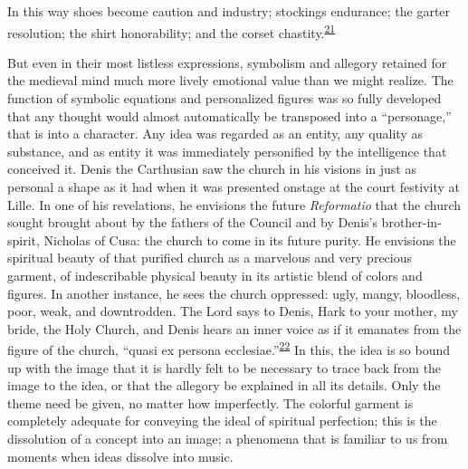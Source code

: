 In this way shoes become caution and industry; stockings endurance; the
garter resolution; the shirt honorability; and the corset
chastity.\textsuperscript{\protect\hypertarget{16_Chapter_Nine__THE_DECLINE_OF_SYM.xhtmlux5cux23id_752}{\protect\hyperlink{23_NOTES.xhtmlux5cux23id_753}{21}}}

But even in their most listless expressions, symbolism and allegory
retained for the medieval mind much more lively emotional value than we
might realize. The function of symbolic equations and personalized
figures was so fully developed that any thought would almost
automatically be transposed into a ``personage,'' that is into a
character. Any idea was regarded as an entity, any quality as substance,
and as entity it was immediately personified by the intelligence that
conceived it. Denis the Carthusian saw the church in his visions in just
as personal a shape as it had when it was presented onstage at the court
festivity at Lille. In one of his revelations, he envisions the future
\emph{Reformatio} that the church sought brought about by the fathers of
the Council and by Denis's brother-in-spirit, Nicholas of Cusa: the
church to come in its future purity. He envisions the spiritual beauty
of that purified church as a marvelous and very precious garment, of
indescribable physical beauty in its artistic blend of colors and
figures. In another instance, he sees the church oppressed: ugly, mangy,
bloodless, poor, weak, and downtrodden. The Lord says to Denis, Hark to
your mother, my bride, the Holy Church, and Denis hears an inner voice
as if it emanates from the figure of the church, ``quasi ex persona
ecclesiae.''\textsuperscript{\protect\hypertarget{16_Chapter_Nine__THE_DECLINE_OF_SYM.xhtmlux5cux23id_750}{\protect\hyperlink{23_NOTES.xhtmlux5cux23id_751}{22}}}
In this, the idea is so bound up with the image that it is hardly felt
to be necessary to trace back from the image to the idea, or that the
allegory be explained in all its details. Only the theme need be given,
no matter how imperfectly. The colorful garment is completely adequate
for conveying the ideal of spiritual perfection; this is the dissolution
of a concept into an image; a phenomena that is familiar to us from
moments when ideas dissolve into music.

